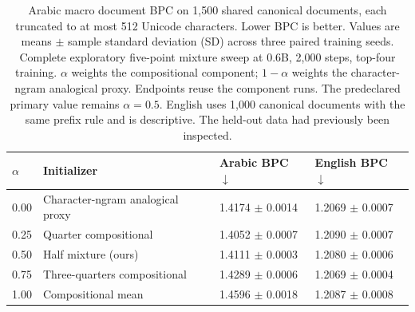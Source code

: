 \begin{table}[t]
\centering
\small
\setlength{\tabcolsep}{4pt}
\begin{tabular}{@{}llll@{}}
\toprule
$\alpha$ & Initializer & Arabic BPC $\downarrow$ & English BPC $\downarrow$ \\
\midrule
0.00 & Character-ngram analogical proxy & 1.4174 $\pm$ 0.0014 & 1.2069 $\pm$ 0.0007 \\
0.25 & Quarter compositional & 1.4052 $\pm$ 0.0007 & 1.2090 $\pm$ 0.0007 \\
0.50 & Half mixture (ours) & 1.4111 $\pm$ 0.0003 & 1.2080 $\pm$ 0.0006 \\
0.75 & Three-quarters compositional & 1.4289 $\pm$ 0.0006 & 1.2069 $\pm$ 0.0004 \\
1.00 & Compositional mean & 1.4596 $\pm$ 0.0018 & 1.2087 $\pm$ 0.0008 \\
\bottomrule
\end{tabular}
\caption{Arabic macro document BPC on 1,500 shared canonical documents, each truncated to at most 512 Unicode characters. Lower BPC is better. Values are means $\pm$ sample standard deviation (SD) across three paired training seeds. Complete exploratory five-point mixture sweep at 0.6B, 2,000 steps, top-four training. $\alpha$ weights the compositional component; $1-\alpha$ weights the character-ngram analogical proxy. Endpoints reuse the component runs. The predeclared primary value remains $\alpha=0.5$. English uses 1,000 canonical documents with the same prefix rule and is descriptive. The held-out data had previously been inspected. }
\label{tab:rebuttal-alpha}
\end{table}
